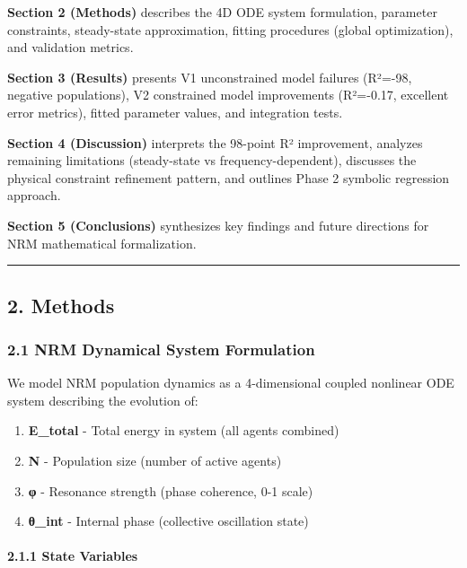 \documentclass[
]{article}
\providecommand{\tightlist}{%
  \setlength{\itemsep}{0pt}\setlength{\parskip}{0pt}}
\begin{document}
\textbf{Section 2 (Methods)} describes the 4D ODE system formulation,
parameter constraints, steady-state approximation, fitting procedures
(global optimization), and validation metrics.

\textbf{Section 3 (Results)} presents V1 unconstrained model failures
(R²=-98, negative populations), V2 constrained model improvements
(R²=-0.17, excellent error metrics), fitted parameter values, and
integration tests.

\textbf{Section 4 (Discussion)} interprets the 98-point R² improvement,
analyzes remaining limitations (steady-state vs frequency-dependent),
discusses the physical constraint refinement pattern, and outlines Phase
2 symbolic regression approach.

\textbf{Section 5 (Conclusions)} synthesizes key findings and future
directions for NRM mathematical formalization.

\begin{center}\rule{0.5\linewidth}{0.5pt}\end{center}

\subsection{2. Methods}\label{methods}

\subsubsection{2.1 NRM Dynamical System
Formulation}\label{nrm-dynamical-system-formulation}

We model NRM population dynamics as a 4-dimensional coupled nonlinear
ODE system describing the evolution of:

\begin{enumerate}
\def\labelenumi{\arabic{enumi}.}
\tightlist
\item
  \textbf{E\_total} - Total energy in system (all agents combined)
\item
  \textbf{N} - Population size (number of active agents)
\item
  \textbf{φ} - Resonance strength (phase coherence, 0-1 scale)
\item
  \textbf{θ\_int} - Internal phase (collective oscillation state)
\end{enumerate}

\paragraph{2.1.1 State Variables}\label{state-variables}
\end{document}
